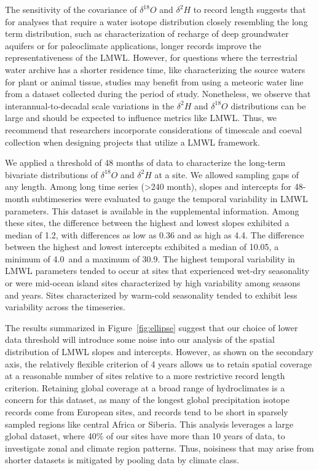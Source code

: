 \documentclass[draft, linenumbers]{agujournal2018}
\begin{document}
The sensitivity of the covariance of $\delta^{18}O$ and $\delta^{2}H$ to record length suggests that for analyses that require a water isotope distribution closely resembling the long term distribution, such as characterization of recharge of deep groundwater aquifers or for paleoclimate applications, longer records improve the representativeness of the LMWL. However, for questions where the terrestrial water archive has a shorter residence time, like characterizing the source waters for plant or animal tissue, studies may benefit from using a meteoric water line from a dataset collected during the period of study. Nonetheless, we observe that interannual-to-decadal scale variations in the $\delta^{2}H$ and $\delta^{18}O$ distributions can be large and should be expected to influence metrics like LMWL. Thus, we recommend that researchers incorporate considerations of timescale and coeval collection when designing projects that utilize a LMWL framework.  

We applied a threshold of 48 months of data to characterize the long-term bivariate distributions of $\delta^{18}O$ and $\delta^{2}H$ at a site. We allowed sampling gaps of any length. Among long time series (\textgreater 240 month), slopes and intercepts for 48-month subtimeseries were evaluated to gauge the temporal variability in LMWL parameters. This dataset is available in the supplemental information. Among these sites, the difference between the highest and lowest slopes exhibited a median of 1.2, with differences as low as 0.36 and as high as 4.4. The difference between the highest and lowest intercepts exhibited a median of 10.05\textperthousand, a minimum of 4.0\textperthousand\ and a maximum of 30.9\textperthousand. The highest temporal variability in LMWL parameters tended to occur at sites that experienced wet-dry seasonality or were mid-ocean island sites characterized by high variability among seasons and years. Sites characterized by warm-cold seasonality tended to exhibit less variability across the timeseries. 

The results summarized in Figure~\ref{fig:ellipse} suggest that our choice of lower data threshold will introduce some noise into our analysis of the spatial distribution of LMWL slopes and intercepts. However, as shown on the secondary axis, the relatively flexible criterion of 4 years allows us to retain spatial coverage at a reasonable number of sites relative to a more restrictive record length criterion. Retaining global coverage at a broad range of hydroclimates is a concern for this dataset, as many of the longest global precipitation isotope records come from European sites, and records tend to be short in sparsely sampled regions like central Africa or Siberia. This analysis leverages a large global dataset, where 40\% of our sites have more than 10 years of data, to investigate zonal and climate region patterns. Thus, noisiness that may arise from shorter datasets is mitigated by pooling data by climate class. 
\end{document}
